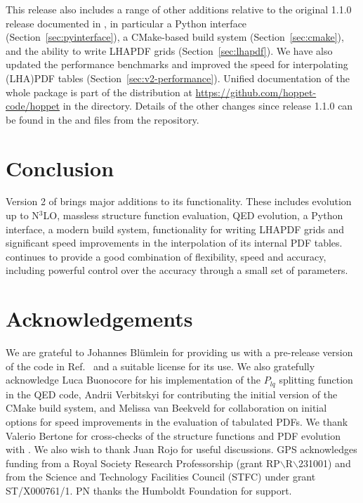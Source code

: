 \documentclass[preprint,1p,a4paper,11pt]{elsarticle}
\begin{document}
This release also includes a range of other additions relative
to the original 1.1.0 release documented in \cite{Salam:2008qg}, in
particular a Python interface
(Section~\ref{sec:pyinterface}), a CMake-based build system
(Section~\ref{sec:cmake}), and the ability to write LHAPDF grids
(Section~\ref{sec:lhapdf}).
%
We have also updated the performance benchmarks and improved the speed
for interpolating (LHA)PDF tables (Section~\ref{sec:v2-performance}).
%
Unified documentation of the whole \hoppet package is part of the
distribution at \url{https://github.com/hoppet-code/hoppet} in the
 directory.
%
Details of the other changes since release 1.1.0 can be found in the
 and  files from the
repository.\medskip

\noindent {}



\section{Conclusion}

Version 2 of \hoppet brings major additions to its functionality.
%
These includes evolution up to N$^3$LO, massless structure function
evaluation, QED evolution, a Python interface, a modern build system,
functionality for writing LHAPDF grids and significant speed
improvements in the interpolation of its internal PDF tables.
%
\hoppet continues to provide a good combination of flexibility, speed
and accuracy, including powerful control over the accuracy through a
small set of parameters.
%


\section*{Acknowledgements}

We are grateful to Johannes Bl\"umlein for providing us with a
pre-release version of the code in Ref.~\cite{BlumleinCode} and a
suitable license for its use.
%
We also gratefully acknowledge Luca Buonocore for his implementation
of the $P_{lq}$ splitting function in the QED code, Andrii Verbitskyi
for contributing the initial version of the CMake build system,
%
and Melissa van Beekveld for collaboration on initial options for speed
improvements in the evaluation of tabulated PDFs.
%
We thank Valerio Bertone for cross-checks of the  structure
functions and PDF evolution with \APFELPP.
%
We also wish to thank Juan Rojo for useful discussions. 
%
GPS acknowledges funding from a Royal Society Research
Professorship (grant RP$\backslash$R$\backslash$231001) and from the Science and
Technology Facilities Council (STFC) under grant ST/X000761/1.
%
PN thanks the Humboldt Foundation for support. 
%
\appendix





%
\end{document}

